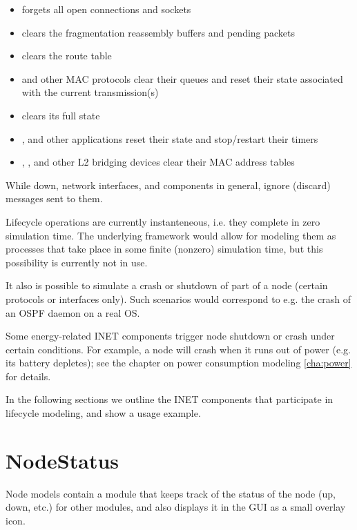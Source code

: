 \begin{itemize}
  \item {} forgets all open connections and sockets
  \item {} clears the fragmentation reassembly buffers and pending packets
  \item {} clears the route table
  \item {} and other MAC protocols clear their queues and reset their state
    associated with the current transmission(s)  %
  \item {} clears its full state
  \item {},  and other applications
    reset their state and stop/restart their timers
  \item {}, , and other L2 bridging
    devices clear their MAC address tables
\end{itemize}

While down, network interfaces, and components in general, ignore (discard)
messages sent to them.

Lifecycle operations are currently instanteneous, i.e. they complete in
zero simulation time. The underlying framework would allow for modeling
them as processes that take place in some finite (nonzero) simulation time,
but this possibility is currently not in use.

It also is possible to simulate a crash or shutdown of part of a node
(certain protocols or interfaces only). Such scenarios would correspond
to e.g. the crash of an OSPF daemon on a real OS.

Some energy-related INET components trigger node shutdown or crash under certain
conditions. For example, a node will crash when it runs out of power (e.g. its
battery depletes); see the chapter on power consumption modeling \ref{cha:power}
for details.

In the following sections we outline the INET components that
participate in lifecycle modeling, and show a usage example.

\section{NodeStatus}
\label{sec:lifecycle:nodestatus}

Node models contain a  module that keeps track of
the status of the node (up, down, etc.) for other modules, and also
displays it in the GUI as a small overlay icon.

